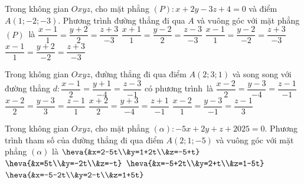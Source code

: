 \begin{ex}%
	Trong không gian $ Oxyz$, cho  mặt phẳng $(P)\colon x+2y-3z+4=0$ và điểm $ A\left(1;-2;-3\right)$. Phương trình đường thẳng đi qua $ A$ và vuông góc với mặt phẳng $\left({P}\right)$~là
	 \choice
		{\True $\dfrac{x-1}{1}=\dfrac{y+2}{2}=\dfrac{z+3}{-3}$} 
		{$\dfrac{x+1}{1}=\dfrac{y-2}{2}=\dfrac{z-3}{-3}$} 
		 {$\dfrac{x-1}{1}=\dfrac{y-2}{-2}=\dfrac{z+3}{-3}$}
		{$\dfrac{x-1}{1}=\dfrac{y+2}{-2}=\dfrac{z+3}{-3}$} 
\end{ex}

\begin{ex}%
	Trong không gian $ Oxyz$, đường thẳng đi qua  điểm ${A}\left(2;3;1\right)$ và song song với đường thẳng ${d}:\dfrac{{x}-1}{2}=\dfrac{{y}+1}{-4}=\dfrac{{z}-3}{-1}$ có phương trình~là
	\choice 
		 {\True $\dfrac{x-2}{2}=\dfrac{y-3}{-4}=\dfrac{z-1}{-1}$}
		{$ \dfrac{x-2}{2}=\dfrac{y-3}{3}=\dfrac{z-1}{1}$} 
		 {$ \dfrac{x+2}{2}=\dfrac{y+3}{-4}=\dfrac{z+1}{-1}$}
		{$ \dfrac{x-2}{1}=\dfrac{y-3}{-1}=\dfrac{z-1}{3}$} 
\end{ex}

\begin{ex}%
	Trong  không gian $Oxyz$, cho mặt phẳng $(\alpha) \colon -5x+2y+z+2025=0$. Phương trình tham số của đường thẳng đi qua điểm $A(2;1;-5)$ và vuông góc với mặt phẳng $(\alpha)$ là
	 \choice
		 {\True $\heva{&x=2-5t\\&y=1+2t\\&z=-5+t}$}
		{$\heva{&x=5t\\&y=-2t\\&z=-t}$} 
		{$\heva{&x=-5+2t\\&y=2+t\\&z=1-5t}$} 
		{$\heva{&x=-5-2t\\&y=2-t\\&z=1+5t}$} 
\end{ex}

